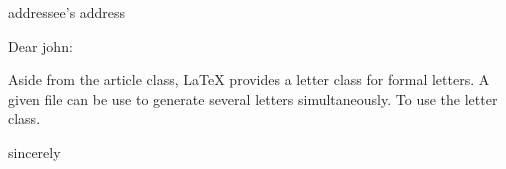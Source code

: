 \documentclass{letter}
\date{\today{}}
\begin{document}
\begin{letter}

addressee's address

\opening{Dear john:}

Aside from the article class, LaTeX provides a letter class for formal letters. A given file can be use to generate several letters simultaneously. To use the letter class.

\closing{sincerely}

\end{letter}
\end{document}
